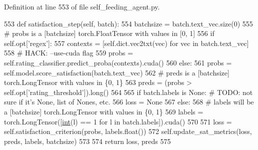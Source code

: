 Definition at line 553 of file self\+\_\+feeding\+\_\+agent.\+py.


\begin{DoxyCode}
553     \textcolor{keyword}{def }satisfaction\_step(self, batch):
554         batchsize = batch.text\_vec.size(0)
555         \textcolor{comment}{# probs is a [batchsize] torch.FloatTensor with values in [0, 1]}
556         \textcolor{keywordflow}{if} self.opt[\textcolor{stringliteral}{'regex'}]:
557             contexts = [self.dict.vec2txt(vec) \textcolor{keywordflow}{for} vec \textcolor{keywordflow}{in} batch.text\_vec]
558             \textcolor{comment}{# HACK: --use-cuda flag}
559             probs = self.rating\_classifier.predict\_proba(contexts).cuda()
560         \textcolor{keywordflow}{else}:
561             probs = self.model.score\_satisfaction(batch.text\_vec)
562         \textcolor{comment}{# preds is a [batchsize] torch.LongTensor with values in \{0, 1\}}
563         preds = (probs > self.opt[\textcolor{stringliteral}{'rating\_threshold'}]).long()
564 
565         \textcolor{keywordflow}{if} batch.labels \textcolor{keywordflow}{is} \textcolor{keywordtype}{None}:  \textcolor{comment}{# TODO: not sure if it's None, list of Nones, etc.}
566             loss = \textcolor{keywordtype}{None}
567         \textcolor{keywordflow}{else}:
568             \textcolor{comment}{# labels will be a [batchsize] torch.LongTensor with values in \{0, 1\}}
569             labels = torch.LongTensor([\hyperlink{namespacelanguage__model_1_1eval__ppl_a7d12ee00479673c5c8d1f6d01faa272a}{int}(l) == 1 \textcolor{keywordflow}{for} l \textcolor{keywordflow}{in} batch.labels]).cuda()
570 
571             loss = self.satisfaction\_criterion(probs, labels.float())
572             self.update\_sat\_metrics(loss, preds, labels, batchsize)
573 
574         \textcolor{keywordflow}{return} loss, preds
575 
\end{DoxyCode}
\mbox{\label{classprojects_1_1self__feeding_1_1self__feeding__agent_1_1SelfFeedingAgent_ad0e1cbdcc32b0c50e15de866efd963f3}} 
